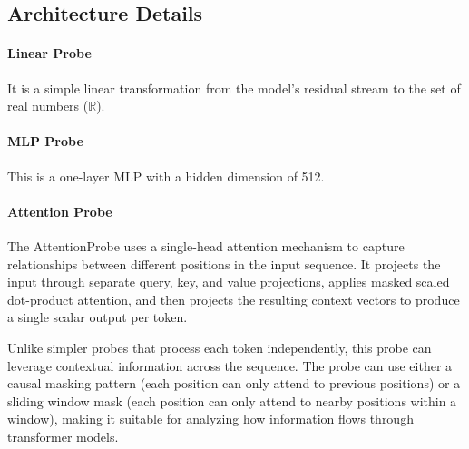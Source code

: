 \subsection{Architecture Details} 

\paragraph{Linear Probe} It is a simple linear transformation from the model's residual stream to the set of real numbers ($\mathbb{R}$).

\paragraph{MLP Probe} This is a one-layer MLP with a hidden dimension of 512. 

\paragraph{Attention Probe} 
The AttentionProbe uses a single-head attention mechanism to capture relationships between different positions in the input sequence. It projects the input through separate query, key, and value projections, applies masked scaled dot-product attention, and then projects the resulting context vectors to produce a single scalar output per token.

Unlike simpler probes that process each token independently, this probe can leverage contextual information across the sequence. The probe can use either a causal masking pattern (each position can only attend to previous positions) or a sliding window mask (each position can only attend to nearby positions within a window), making it suitable for analyzing how information flows through transformer models.

